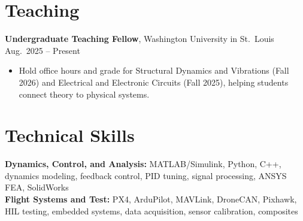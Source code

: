 \documentclass[11pt, letterpaper]{article}
\begin{document}
\section{Teaching}
\noindent\textbf{Undergraduate Teaching Fellow}, Washington University in St.\ Louis \hfill Aug.\ 2025 -- Present \par
\begin{itemize}
\item Hold office hours and grade for Structural Dynamics and Vibrations (Fall 2026) and Electrical and Electronic Circuits (Fall 2025), helping students connect theory to physical systems.
\end{itemize}

\section{Technical Skills}
{\raggedright
\textbf{Dynamics, Control, and Analysis:} MATLAB/Simulink, Python, C++, dynamics modeling, feedback control, PID tuning, signal processing, ANSYS FEA, SolidWorks \\
\textbf{Flight Systems and Test:} PX4, ArduPilot, MAVLink, DroneCAN, Pixhawk, HIL testing, embedded systems, data acquisition, sensor calibration, composites\par}
\end{document}
